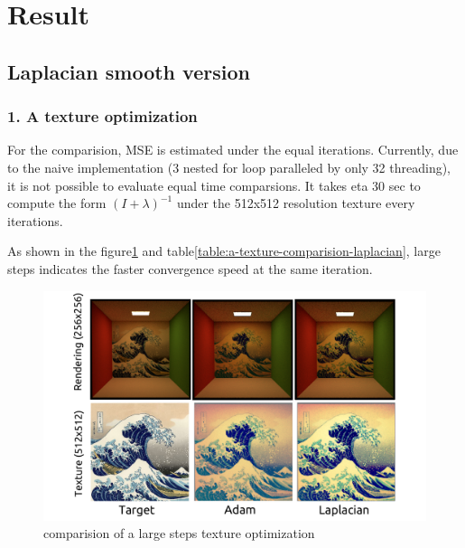 \section*{Result}\label{ch:ch4label}

\subsection*{Laplacian smooth version}
\subsubsection{1. A texture optimization}

For the comparision, MSE is estimated under the equal iterations.
Currently, due to the naive implementation (3 nested for loop paralleled by only 32 threading), it is not possible to evaluate equal time comparsions. It takes eta 30 sec to compute the form $(I+\lambda)^{-1}$ under the 512x512 resolution texture every iterations. 

As shown in the figure\ref{fig:a-texture-comparision-laplacian} and table\ref{table:a-texture-comparision-laplacian}, large steps indicates the faster convergence speed at the same iteration.

\begin{figure}[!h]
    \includegraphics[width=\textwidth]{figures/result-1.png}
    \caption{comparision of a large steps texture optimization}
    \label{fig:a-texture-comparision-laplacian}
\end{figure}

\begin{table}[!h]
	\centering
	\caption{comparision of a large steps texture optimization}
	\label{table:a-texture-comparision-laplacian}
\end{table}

